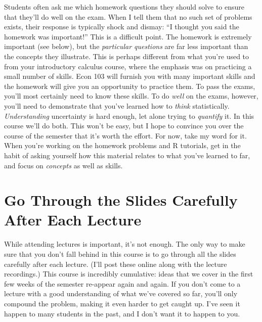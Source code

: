 \documentclass[12pt,letterpaper]{article}
\begin{document}
Students often ask me which homework questions they should solve to ensure that they'll do well on the exam. When I tell them that no such set of problems exists, their response is typically shock and dismay: ``I thought you said the homework was important!'' This is a difficult point. The homework is extremely important (see below), but the \emph{particular questions} are far less important than the concepts they illustrate. This is perhaps different from what you're used to from your introductory calculus course, where the emphasis was on practicing a small number of skills. Econ 103 will furnish you with many important skills and the homework will give you an opportunity to practice them. To pass the exams, you'll most certainly need to know these skills. To do \emph{well} on the exams, however, you'll need to demonstrate that you've learned how to \emph{think} statistically. \emph{Understanding} uncertainty is hard enough, let alone trying to \emph{quantify} it. In this course we'll do both. This won't be easy, but I hope to convince you over the course of the semester that it's worth the effort. For now, take my word for it. When you're working on the homework problems and R tutorials, get in the habit of asking yourself how this material relates to what you've learned to far, and focus on \emph{concepts} as well as skills.


\section{Go Through the Slides Carefully After Each Lecture}
While attending lectures is important, it's not enough. 
The only way to make sure that you don't fall behind in this course is to go through all the slides carefully after each lecture.
(I'll post these online along with the lecture recordings.)
This course is incredibly cumulative: ideas that we cover in the first few weeks of the semester re-appear again and again.
If you don't come to a lecture with a good understanding of what we've covered so far, you'll only compound the problem, making it even harder to get caught up.
I've seen it happen to many students in the past, and I don't want it to happen to you.
\end{document}
